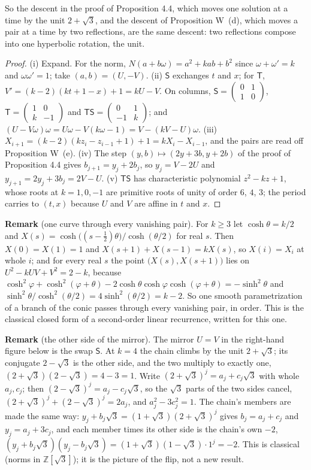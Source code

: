 \documentclass[11pt]{article}
\begin{document}
So the descent in the proof of Proposition 4.4, which moves one solution at a time by the unit $2+\sqrt3$, and the descent of Proposition W~(d), which moves a pair at a time by two reflections, are the same descent: two reflections compose into one hyperbolic rotation, the unit.

\begin{proof}
(i) Expand. For the norm, $N(a+b\omega)=a^2+kab+b^2$ since $\omega+\omega'=k$ and $\omega\omega'=1$; take $(a,b)=(U,-V)$. (ii) $\mathsf{S}$ exchanges $t$ and $x$; for $\mathsf{T}$, $V'=(k-2)(kt+1-x)+1=kU-V$. On columns, $\mathsf{S}=\begin{pmatrix}0&1\\1&0\end{pmatrix}$, $\mathsf{T}=\begin{pmatrix}1&0\\k&-1\end{pmatrix}$ and $\mathsf{T}\mathsf{S}=\begin{pmatrix}0&1\\-1&k\end{pmatrix}$; and $(U-V\omega)\omega=U\omega-V(k\omega-1)=V-(kV-U)\omega$. (iii) $X_{i+1}=(k-2)(kz_i-z_{i-1}+1)+1=kX_i-X_{i-1}$, and the pairs are read off Proposition W~(e). (iv) The step $(y,b)\mapsto(2y+3b,y+2b)$ of the proof of Proposition 4.4 gives $b_{j+1}=y_j+2b_j$, so $y_j=V-2U$ and $y_{j+1}=2y_j+3b_j=2V-U$. (v) $\mathsf{T}\mathsf{S}$ has characteristic polynomial $z^2-kz+1$, whose roots at $k=1,0,-1$ are primitive roots of unity of order $6$, $4$, $3$; the period carries to $(t,x)$ because $U$ and $V$ are affine in $t$ and $x$.
\end{proof}

\medskip
\noindent\textbf{Remark} (one curve through every vanishing pair). For $k\ge3$ let $\cosh\theta=k/2$ and $X(s)=\cosh\bigl((s-\frac12)\theta\bigr)/\cosh(\theta/2)$ for real $s$. Then $X(0)=X(1)=1$ and $X(s+1)+X(s-1)=kX(s)$, so $X(i)=X_i$ at whole $i$; and for every real $s$ the point $\bigl(X(s),X(s+1)\bigr)$ lies on $U^2-kUV+V^2=2-k$, because $\cosh^2\varphi+\cosh^2(\varphi+\theta)-2\cosh\theta\cosh\varphi\cosh(\varphi+\theta)=-\sinh^2\theta$ and $\sinh^2\theta/\cosh^2(\theta/2)=4\sinh^2(\theta/2)=k-2$. So one smooth parametrization of a branch of the conic passes through every vanishing pair, in order. This is the classical closed form of a second-order linear recurrence, written for this one.

\medskip
\noindent\textbf{Remark} (the other side of the mirror). The mirror $U=V$ in the right-hand figure below is the swap $\mathsf{S}$. At $k=4$ the chain climbs by the unit $2+\sqrt3$; its conjugate $2-\sqrt3$ is the other side, and the two multiply to exactly one, $(2+\sqrt3)(2-\sqrt3)=4-3=1$. Write $(2+\sqrt3)^j=a_j+c_j\sqrt3$ with whole $a_j,c_j$; then $(2-\sqrt3)^j=a_j-c_j\sqrt3$, so the $\sqrt3$ parts of the two sides cancel, $(2+\sqrt3)^j+(2-\sqrt3)^j=2a_j$, and $a_j^2-3c_j^2=1$. The chain's members are made the same way: $y_j+b_j\sqrt3=(1+\sqrt3)(2+\sqrt3)^j$ gives $b_j=a_j+c_j$ and $y_j=a_j+3c_j$, and each member times its other side is the chain's own $-2$, $(y_j+b_j\sqrt3)(y_j-b_j\sqrt3)=(1+\sqrt3)(1-\sqrt3)\cdot1^j=-2$. This is classical (norms in $\mathbb{Z}[\sqrt3]$); it is the picture of the flip, not a new result.
\end{document}
